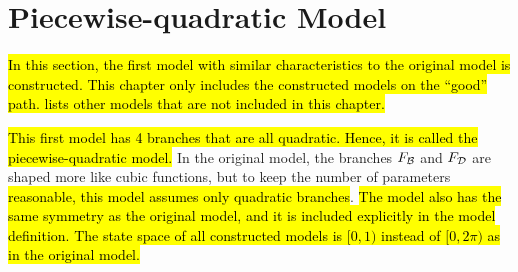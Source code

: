 \section{Piecewise-quadratic Model}
\label{sec:setup.quad}

\hl{
	In this section, the first model with similar characteristics to the original model is constructed.
	This chapter only includes the constructed models on the ``good'' path.
	 lists other models that are not included in this chapter.
}

\hl{
	This first model has 4 branches that are all quadratic.
	Hence, it is called the piecewise-quadratic model.
}
In the original model, the branches $F_{\mathcal{B}}$ and $F_{\mathcal{D}}$ are shaped more like cubic functions, but to keep the number of parameters \hl{reasonable, this model assumes only quadratic branches}.
\hl{
The model also has the same symmetry as the original model, and it is included explicitly in the model definition.
The state space of all constructed models is $[0, 1)$ instead of $[0, 2\pi)$ as in the original model.
}




